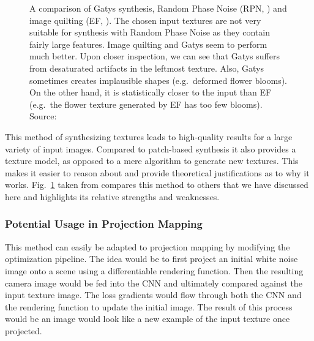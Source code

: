 \begin{figure}[h]
    \begin{subfigure}[b]{\textwidth}
        \centering
    \end{subfigure}
    \caption{A comparison of Gatys synthesis, Random Phase Noise (RPN, \citet{Galerne2011}) and image quilting (EF, \citet{Efros2001}). The chosen input textures are not very suitable for synthesis with Random Phase Noise as they contain fairly large features. Image quilting and Gatys seem to perform much better. Upon closer inspection, we can see that Gatys suffers from desaturated artifacts in the leftmost texture. Also, Gatys sometimes creates implausible shapes (e.g.~deformed flower blooms). On the other hand, it is statistically closer to the input than EF (e.g.~the flower texture generated by EF has too few blooms). Source: \citet{Raad2018}}
    \label{fig:background_synthesis_comparison}
\end{figure}

This method of synthesizing textures leads to high-quality results for a large variety of input images. Compared to patch-based synthesis it also provides a texture model, as opposed to a mere algorithm to generate new textures. This makes it easier to reason about and provide theoretical justifications as to why it works. Fig.~\ref{fig:background_synthesis_comparison} taken from \citet{Raad2018} compares this method to others that we have discussed here and highlights its relative strengths and weaknesses.

\subsubsection{Potential Usage in Projection Mapping}
\label{section:background-texture_synthesis-statistics_based-projection_mapping}

This method can easily be adapted to projection mapping by modifying the optimization pipeline. The idea would be to first project an initial white noise image onto a scene using a differentiable rendering function. Then the resulting camera image would be fed into the CNN and ultimately compared against the input texture image. The loss gradients would flow through both the CNN and the rendering function to update the initial image. The result of this process would be an image would look like a new example of the input texture once projected.